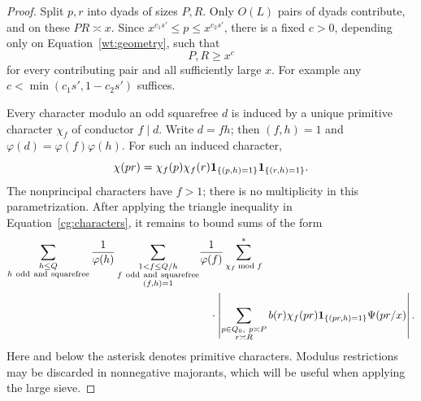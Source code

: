 \begin{proof}
Split $p,r$ into dyads of sizes $P,R$. Only $O(L)$ pairs of dyads
contribute, and on these $PR\asymp x$. Since
$x^{c_1s'}\le p\le x^{c_2s'}$, there is a fixed $c>0$, depending
only on Equation~\eqref{wt:geometry}, such that
\begin{equation}\label{cg:factor-ranges}
 P,R\ge x^c
\end{equation}
for every contributing pair and all sufficiently large $x$.
For example any $c<\min(c_1s',1-c_2s')$ suffices.

Every character modulo an odd squarefree $d$ is induced by a unique
primitive character $\chi_f$ of conductor $f\mid d$. Write $d=fh$;
then $(f,h)=1$ and $\varphi(d)=\varphi(f)\varphi(h)$. For such an
induced character,
\[
 \chi(pr)=\chi_f(p)\chi_f(r)
                  \mathbf{1}_{\{(p,h)=1\}}\mathbf{1}_{\{(r,h)=1\}}.
\]
The nonprincipal characters have $f>1$; there is no multiplicity in
this parametrization. After applying the triangle inequality in
Equation~\eqref{cg:characters}, it remains to bound sums of the form
\begin{equation}\label{cg:primitive-sum}
 \begin{split}
 \sum_{\substack{h\le Q\\h\ {\rm odd\ and\ squarefree}}}
 \frac1{\varphi(h)}
 \sum_{\substack{1<f\le Q/h\\f\ {\rm odd\ and\ squarefree}\\(f,h)=1}}
 &\frac1{\varphi(f)}\sum_{\chi_f\bmod f}^{*}\\
 &\quad\cdot
 \left|\sum_{\substack{p\in Q_0,\ p\asymp P\\r\asymp R}}
       b(r)\chi_f(pr)\mathbf{1}_{\{(pr,h)=1\}}\Psi(pr/x)\right|.
 \end{split}
\end{equation}
Here and below the asterisk denotes primitive characters. Modulus
restrictions may be discarded in nonnegative majorants, which will
be useful when applying the large sieve.


\end{proof}
